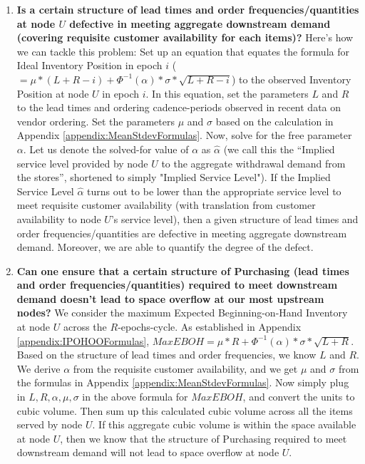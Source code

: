 \documentclass[11pt]{amsart}
\begin{document}
\begin{enumerate}

\item {\bf Is a certain structure of lead times and order frequencies/quantities at node $U$ defective in meeting aggregate downstream demand (covering requisite customer availability for each items)?} Here's how we can tackle this problem: Set up an equation that equates the formula for Ideal Inventory Position in epoch $i$ ($ = \mu * (L + R - i) + \Phi^{-1}(\alpha) * \sigma * \sqrt{L+R-i}$) to the observed Inventory Position at node $U$ in epoch $i$. In this equation, set the parameters $L$ and $R$ to the lead times and ordering cadence-periods observed in recent data on vendor ordering. Set the parameters $\mu$ and $\sigma$ based on the calculation in Appendix \ref{appendix:MeanStdevFormulas}. Now, solve for the free parameter $\alpha$. Let us denote the solved-for value of $\alpha$ as $\hat{\alpha}$ (we call this the ``Implied service level provided by node $U$ to the aggregate withdrawal demand from the stores'', shortened to simply "Implied Service Level"). If the Implied Service Level $\hat{\alpha}$ turns out to be lower than the appropriate service level to meet requisite customer availability (with translation from customer availability to node $U$'s service level), then a given structure of lead times and order frequencies/quantities are defective in meeting aggregate downstream demand. Moreover, we are able to quantify the degree of the defect.

\item {\bf Can one ensure that a certain structure of Purchasing (lead times and order frequencies/quantities) required to meet downstream demand doesn't lead to space overflow at our most upstream nodes?} We consider the maximum Expected Beginning-on-Hand Inventory at node $U$ across the $R$-epochs-cycle. As established in Appendix \ref{appendix:IPOHOOFormulas}, $Max EBOH =  \mu * R + \Phi^{-1}(\alpha) * \sigma * \sqrt{L+R}$. Based on the structure of lead times and order frequencies, we know $L$ and $R$. We derive $\alpha$ from the requisite customer availability, and we get $\mu$ and $\sigma$ from the formulas in Appendix \ref{appendix:MeanStdevFormulas}. Now simply plug in $L, R, \alpha, \mu, \sigma$ in the above formula for $ Max EBOH$, and convert the units to cubic volume. Then sum up this calculated cubic volume across all the items served by node $U$. If this aggregate cubic volume is within the space available at node $U$, then we know that the structure of Purchasing required to meet downstream demand will not lead to space overflow at node $U$.

\end{enumerate}
\end{document}
